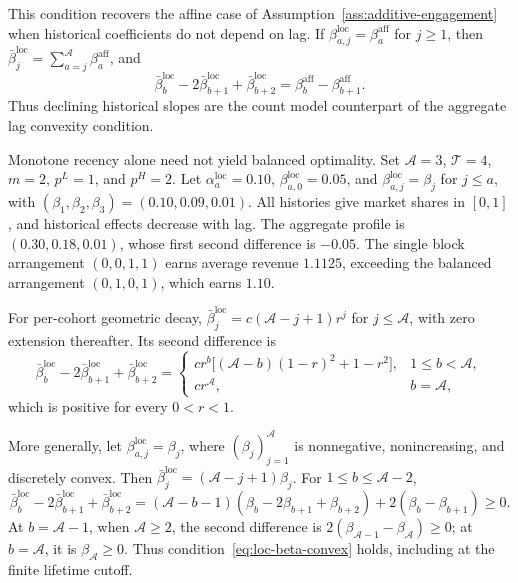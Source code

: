 \begingroup\color{black}
This condition recovers the affine case of Assumption~\ref{ass:additive-engagement} when historical coefficients do not depend on lag. If \(\beta_{a,j}^{\mathrm{loc}}=\beta_a^{\mathrm{aff}}\) for \(j\ge1\), then \(\bar\beta_j^{\mathrm{loc}}=\sum_{a=j}^{\mathcal A}\beta_a^{\mathrm{aff}}\), and
\[
 \bar\beta_b^{\mathrm{loc}}-2\bar\beta_{b+1}^{\mathrm{loc}}
 +\bar\beta_{b+2}^{\mathrm{loc}}
 =\beta_b^{\mathrm{aff}}-\beta_{b+1}^{\mathrm{aff}}.
\]
Thus declining historical slopes are the count model counterpart of the aggregate lag convexity condition.

\par\endgroup
\begingroup\color{black}
Monotone recency alone need not yield balanced optimality. Set \(\mathcal A=3\), \(\mathcal T=4\), \(m=2\), \(p^L=1\), and \(p^H=2\). Let \(\alpha_a^{\mathrm{loc}}=0.10\), \(\beta_{a,0}^{\mathrm{loc}}=0.05\), and \(\beta_{a,j}^{\mathrm{loc}}=\beta_j\) for \(j\le a\), with \((\beta_1,\beta_2,\beta_3)=(0.10,0.09,0.01)\). All histories give market shares in \([0,1]\), and historical effects decrease with lag. The aggregate profile is \((0.30,0.18,0.01)\), whose first second difference is \(-0.05\). The single block arrangement \((0,0,1,1)\) earns average revenue \(1.1125\), exceeding the balanced arrangement \((0,1,0,1)\), which earns \(1.10\).
\par\endgroup

{\color{black}
For per-cohort geometric decay, \(\bar\beta_j^{\mathrm{loc}}=c(\mathcal A-j+1)r^j\) for \(j\le\mathcal A\), with zero extension thereafter. Its second difference is
\[
 \bar\beta_b^{\mathrm{loc}}-2\bar\beta_{b+1}^{\mathrm{loc}}
 +\bar\beta_{b+2}^{\mathrm{loc}}
 =
 \begin{cases}
 cr^b\bigl[(\mathcal A-b)(1-r)^2+1-r^2\bigr],
       &1\le b<\mathcal A,\\
 cr^{\mathcal A},&b=\mathcal A,
 \end{cases}
\]
which is positive for every \(0<r<1\).

More generally, let \(\beta_{a,j}^{\mathrm{loc}}=\beta_j\), where \((\beta_j)_{j=1}^{\mathcal A}\) is nonnegative, nonincreasing, and discretely convex. Then \(\bar\beta_j^{\mathrm{loc}}=(\mathcal A-j+1)\beta_j\). For \(1\le b\le\mathcal A-2\),
\[
 \bar\beta_b^{\mathrm{loc}}-2\bar\beta_{b+1}^{\mathrm{loc}}
 +\bar\beta_{b+2}^{\mathrm{loc}}
 =(\mathcal A-b-1)(\beta_b-2\beta_{b+1}+\beta_{b+2})
 +2(\beta_b-\beta_{b+1})\ge0.
\]
At \(b=\mathcal A-1\), when \(\mathcal A\ge2\), the second difference is \(2(\beta_{\mathcal A-1}-\beta_{\mathcal A})\ge0\); at \(b=\mathcal A\), it is \(\beta_{\mathcal A}\ge0\). Thus condition~\eqref{eq:loc-beta-convex} holds, including at the finite lifetime cutoff.
\par}
